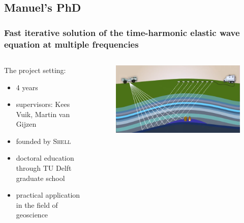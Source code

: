 \documentclass{beamer}
\begin{document}
\subsection{Manuel's PhD}
\begin{frame}
\frametitle{Fast iterative solution of the time-harmonic elastic wave equation at multiple frequencies}
\begin{columns}
\begin{column}{0.6\textwidth}
 The project setting:
 \begin{itemize}
  \item 4 years
  \item supervisors: Kees Vuik, Martin van Gijzen
  \item founded by \textsc{Shell}
  \item doctoral education through TU Delft graduate school
  \item practical application in the field of geoscience
 \end{itemize}
\end{column}
\begin{column}{0.4\textwidth}
\begin{figure}[t]
\centering
\vspace{-1.3cm}
\includegraphics[width=\textwidth]{images/snapshot1.png}
\end{figure}
\end{column}
\end{columns}

\end{frame}
\end{document}
